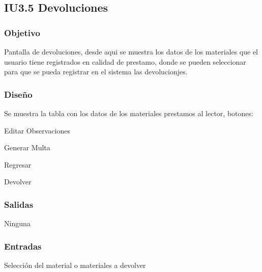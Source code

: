 
\newpage
\subsection{IU3.5 Devoluciones}

\subsubsection{Objetivo}
	Pantalla de devoluciones, desde aqui se muestra los datos de los materiales que el usuario tiene registrados en calidad de prestamo, donde se pueden seleccionar para que se pueda registrar en el sistema las devolucionjes. 

\subsubsection{Diseño}
	Se muestra la tabla con los datos de los materiales prestamos al lector, botones:
	\begin{Citemize}
		\item Editar Observaciones
		\item Generar Multa
		\item Regresar
		\item Devolver
	\end{Citemize}


\subsubsection{Salidas}
	\begin{Citemize}
		\item Ninguna
	\end{Citemize}
	
\subsubsection{Entradas}
	\begin{Citemize}
		\item Selección del material o materiales a devolver
	\end{Citemize}